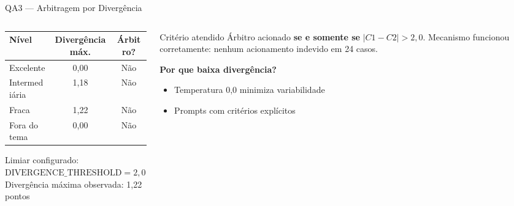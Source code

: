 \documentclass[10pt,aspectratio=169]{beamer}
\begin{document}
\begin{frame}{QA3 — Arbitragem por Divergência}
  \begin{columns}[T]
    \begin{column}{0.55\textwidth}
      \begin{center}
        \small
        \begin{tabular}{lcc}
          \toprule
          \textbf{Nível} & \textbf{Divergência máx.} & \textbf{Árbitro?} \\
          \midrule
          Excelente      & 0,00 & Não \\
          Intermediária  & 1,18 & Não \\
          Fraca          & 1,22 & Não \\
          Fora do tema   & 0,00 & Não \\
          \bottomrule
        \end{tabular}
      \end{center}
      \vspace{0.3em}
      Limiar configurado: $\text{DIVERGENCE\_THRESHOLD} = 2{,}0$\\
      Divergência máxima observada: \alert{1,22 pontos}
    \end{column}
    \begin{column}{0.41\textwidth}
      \begin{block}{Critério atendido}
        Árbitro acionado \textbf{se e somente se} $|C1 - C2| > 2{,}0$. Mecanismo funcionou corretamente: nenhum acionamento indevido em 24 casos.
      \end{block}
      \vspace{0.4em}
      \textbf{Por que baixa divergência?}
      \begin{itemize}
        \item Temperatura 0,0 minimiza variabilidade
        \item Prompts com critérios explícitos
      \end{itemize}
    \end{column}
  \end{columns}
\end{frame}
\end{document}
